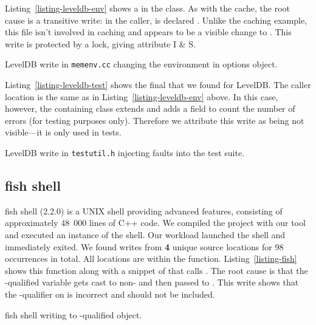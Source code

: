 Listing~\ref{listing-leveldb-env} shows a \wtc{} in the 
class.
As with the cache, the root cause is a transitive write: in the caller,
 is declared .
Unlike the caching example, this file isn't involved in caching and appears to
be a visible change to .
This write is protected by a lock, giving attribute I \& S.

\begin{listing}[!htb]
  \caption{LevelDB write in \texttt{memenv.cc} changing the environment in
           options object.}
  \label{listing-leveldb-env}
  \centering
  
\end{listing}

Listing~\ref{listing-leveldb-test} shows the final \wtcq{} that we found for
LevelDB.
The caller location is the same as in Listing~\ref{listing-leveldb-env} above.
In this case, however, the containing class extends  and adds
a field to count the number of errors (for testing purposes only).
Therefore we attribute this write as being not visible---it is only used in
tests.

\begin{listing}[!htb]
  \caption{LevelDB write in \texttt{testutil.h} injecting faults into
           the test suite.}
  \label{listing-leveldb-test}
  \centering
  
\end{listing}

\subsection{fish shell}

fish shell (2.2.0) is a UNIX shell providing advanced features, consisting of
approximately 48~000 lines of C++ code.
We compiled the project with our tool and executed an instance of the shell.
Our workload launched the shell and immediately exited.
We found writes from {\bf 4} unique source locations for 98 occurrences in total.
All locations are within the  function.
Listing~\ref{listing-fish} shows this function along with a snippet of
 that calls .
The root cause is that the \const{}-qualified 
variable gets cast to non-\const{} and then passed to .
This write shows that the \const{}-qualifier on  is incorrect and
should not be included.

\begin{listing}[!htb]
  \caption{fish shell writing to \const{}-qualified  object.}
  \label{listing-fish}
  \centering
  
\end{listing}

